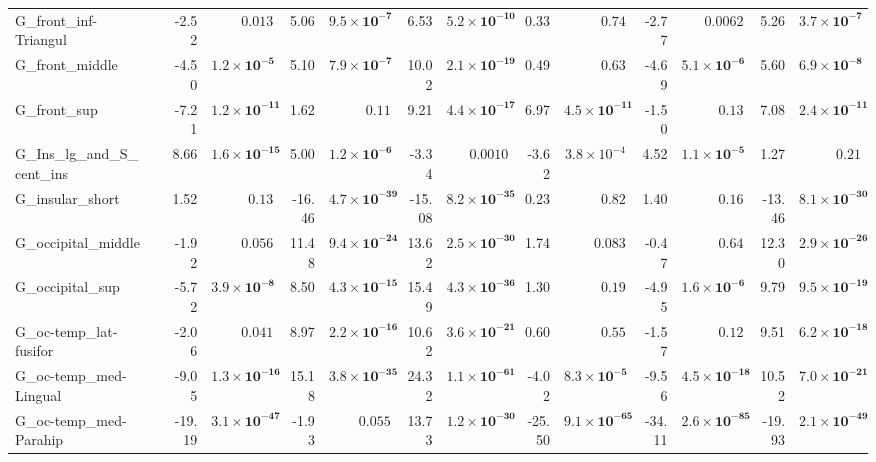 {\begin{longtable}{llrrrrrrrrrrrr}
G\_front\_inf-Triangul &  & -2.52 & $0.013$ & 5.06 & $\mathbf{9.5{\times}10^{-7}}$ & 6.53 & $\mathbf{5.2{\times}10^{-10}}$ & 0.33 & $0.74$ & -2.77 & $0.0062$ & 5.26 & $\mathbf{3.7{\times}10^{-7}}$ \\
G\_front\_middle &  & -4.50 & $\mathbf{1.2{\times}10^{-5}}$ & 5.10 & $\mathbf{7.9{\times}10^{-7}}$ & 10.02 & $\mathbf{2.1{\times}10^{-19}}$ & 0.49 & $0.63$ & -4.69 & $\mathbf{5.1{\times}10^{-6}}$ & 5.60 & $\mathbf{6.9{\times}10^{-8}}$ \\
G\_front\_sup &  & -7.21 & $\mathbf{1.2{\times}10^{-11}}$ & 1.62 & $0.11$ & 9.21 & $\mathbf{4.4{\times}10^{-17}}$ & 6.97 & $\mathbf{4.5{\times}10^{-11}}$ & -1.50 & $0.13$ & 7.08 & $\mathbf{2.4{\times}10^{-11}}$ \\
G\_Ins\_lg\_and\_S\_cent\_ins &  & 8.66 & $\mathbf{1.6{\times}10^{-15}}$ & 5.00 & $\mathbf{1.2{\times}10^{-6}}$ & -3.34 & $0.0010$ & -3.62 & $3.8{\times}10^{-4}$ & 4.52 & $\mathbf{1.1{\times}10^{-5}}$ & 1.27 & $0.21$ \\
G\_insular\_short &  & 1.52 & $0.13$ & -16.46 & $\mathbf{4.7{\times}10^{-39}}$ & -15.08 & $\mathbf{8.2{\times}10^{-35}}$ & 0.23 & $0.82$ & 1.40 & $0.16$ & -13.46 & $\mathbf{8.1{\times}10^{-30}}$ \\
G\_occipital\_middle &  & -1.92 & $0.056$ & 11.48 & $\mathbf{9.4{\times}10^{-24}}$ & 13.62 & $\mathbf{2.5{\times}10^{-30}}$ & 1.74 & $0.083$ & -0.47 & $0.64$ & 12.30 & $\mathbf{2.9{\times}10^{-26}}$ \\
G\_occipital\_sup &  & -5.72 & $\mathbf{3.9{\times}10^{-8}}$ & 8.50 & $\mathbf{4.3{\times}10^{-15}}$ & 15.49 & $\mathbf{4.3{\times}10^{-36}}$ & 1.30 & $0.19$ & -4.95 & $\mathbf{1.6{\times}10^{-6}}$ & 9.79 & $\mathbf{9.5{\times}10^{-19}}$ \\
G\_oc-temp\_lat-fusifor &  & -2.06 & $0.041$ & 8.97 & $\mathbf{2.2{\times}10^{-16}}$ & 10.62 & $\mathbf{3.6{\times}10^{-21}}$ & 0.60 & $0.55$ & -1.57 & $0.12$ & 9.51 & $\mathbf{6.2{\times}10^{-18}}$ \\
G\_oc-temp\_med-Lingual &  & -9.05 & $\mathbf{1.3{\times}10^{-16}}$ & 15.18 & $\mathbf{3.8{\times}10^{-35}}$ & 24.32 & $\mathbf{1.1{\times}10^{-61}}$ & -4.02 & $\mathbf{8.3{\times}10^{-5}}$ & -9.56 & $\mathbf{4.5{\times}10^{-18}}$ & 10.52 & $\mathbf{7.0{\times}10^{-21}}$ \\
G\_oc-temp\_med-Parahip &  & -19.19 & $\mathbf{3.1{\times}10^{-47}}$ & -1.93 & $0.055$ & 13.73 & $\mathbf{1.2{\times}10^{-30}}$ & -25.50 & $\mathbf{9.1{\times}10^{-65}}$ & -34.11 & $\mathbf{2.6{\times}10^{-85}}$ & -19.93 & $\mathbf{2.1{\times}10^{-49}}$ \\

\end{longtable}}
